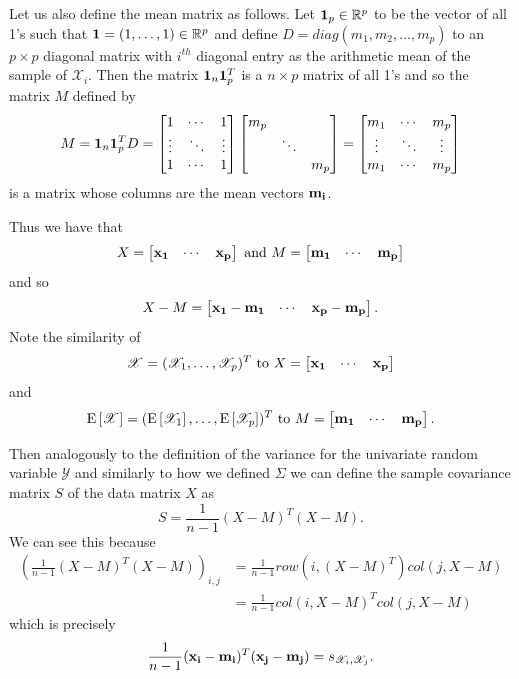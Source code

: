 \documentclass{book}
\newcommand{\bs}[1]{\boldsymbol{#1}}
\newcommand{\rv}[1]{\bs{\mathscr{#1}}}
\newcommand{\e}[1]{\text{E}\left[#1\right]}
\begin{document}
Let us also define the mean matrix as follows. Let ${\bf 1}_p\in\mathbb{R}^p$ to be the vector of all 1's such that ${\bf 1}=(1,\ldots,1)\in\mathbb{R}^p$ and define $D=diag(m_1,m_2,\ldots,m_p)$ to an $p \times p$ diagonal matrix with $i^{th}$ diagonal entry as the arithmetic mean of the sample of $\mathscr{X}_i$. Then the matrix ${\bf 1}_n{\bf 1}_p^T$ is a $n \times p$ matrix of all 1's and so the matrix $M$ defined by 
$$
M={\bf 1}_n{\bf 1}_p^TD=
\begin{bmatrix}
1& \cdots& 1\\
\vdots& \ddots& \vdots\\
1& \cdots& 1\\
\end{bmatrix}
\begin{bmatrix}
m_p& & \\
& \ddots& \\
& & m_p
\end{bmatrix}
=
\begin{bmatrix}
m_1& \cdots& m_p\\
\vdots& \ddots& \vdots\\
m_1& \cdots& m_p
\end{bmatrix}
$$
is a matrix whose columns are the mean vectors ${\bf m_i}$.

Thus we have that
$$
X=
\begin{bmatrix}
{\bf x_1}& \cdots& {\bf x_p}
\end{bmatrix}
\text{ and }
M=\begin{bmatrix}
{\bf m_1}& \cdots& {\bf m_p}
\end{bmatrix}
$$
and so 
$$
X-M=
\begin{bmatrix}
{\bf x_1}-{\bf m_1}& \cdots& {\bf x_p}-{\bf m_p}
\end{bmatrix}.
$$
Note the similarity of
$$
\rv{X}=(\mathscr{X}_1,\ldots,\mathscr{X}_p)^T\text{ to }X=\begin{bmatrix}{\bf x_1}& \cdots& {\bf x_p}\end{bmatrix}
$$
and
$$
\e{\rv{X}}=(\e{\mathscr{X}_1},\ldots,\e{\mathscr{X}_p})^T\text{ to }M=\begin{bmatrix}{\bf m_1}& \cdots& {\bf m_p}\end{bmatrix}.
$$

Then analogously to the definition of the variance for the univariate random variable $\mathscr{Y}$ and similarly to how we defined $\Sigma$ we can define the sample covariance matrix $S$ of the data matrix $X$ as
$$
S=\frac{1}{n-1}(X-M)^T(X-M).
$$
We can see this because
$$
\begin{aligned}
\left(\frac{1}{n-1}(X-M)^T(X-M)\right)_{i,j}&=\frac{1}{n-1}row\left(i,(X-M)^T\right)col(j,X-M)\\
&=\frac{1}{n-1}col(i,X-M)^Tcol(j,X-M)
\end{aligned}
$$
which is precisely 
$$
\frac{1}{n-1}({\bf x_i}-{\bf m_i})^T({\bf x_j}-{\bf m_j})=s_{\mathscr{X}_i,\mathscr{X}_j}.
$$
\end{document}
